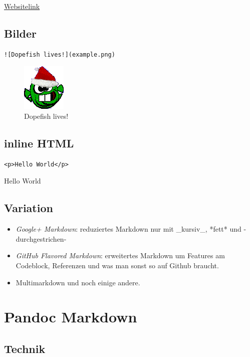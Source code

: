 \href{http://example.com}{Websitelink}

\subsection{Bilder}

\begin{verbatim}
![Dopefish lives!](example.png)
\end{verbatim}

\begin{figure}[htbp]
\centering
\includegraphics{./pictures/example.png}
\caption{Dopefish lives!}
\end{figure}

\subsection{inline HTML}

\begin{verbatim}
<p>Hello World</p>
\end{verbatim}

Hello World

\subsection{Variation}

\begin{itemize}
\item
  \emph{Google+ Markdown}: reduziertes Markdown nur mit \_kursiv\_,
  *fett* und -durchgestrichen-
\item
  \emph{GitHub Flavored Markdown}: erweitertes Markdown um Features am
  Codeblock, Referenzen und was man sonst so auf Github braucht.
\item
  Multimarkdown und noch einige andere.
\end{itemize}

\section{Pandoc Markdown}

\subsection{Technik}

